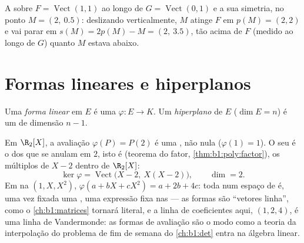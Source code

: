 \begin{omfigure}

{\small A  sobre $F = \operatorname{Vect}(1,1)$ ao longo de $G = \operatorname{Vect}(0,1)$ e a sua simetria,
no ponto $M
= (2,\ 0.5)$: deslizando verticalmente, $M$ atinge $F$ em $p(M) = (2,2)$
e vai parar em $s(M) = 2p(M) - M = (2,\ 3.5)$, tão acima de $F$ (medido ao longo de $G$)
quanto $M$ estava abaixo.}
\end{omfigure}

\section{Formas lineares e hiperplanos}

\begin{definition}\label{def:b1:linmaps:forms}
Uma \emph{forma linear} em $E$ é uma  $\varphi \colon E \to K$. Um \emph{hiperplano} de $E$ ($\dim E = n$)
é um  de dimensão $n - 1$.
\end{definition}

\begin{example}
\label{ex:b1:linmaps:evaluationform}
Em $\R_2[X]$, a avaliação $\varphi(P) = P(2)$ é uma , não nula
($\varphi(1) = 1$). O seu  é o  dos  que se anulam
em $2$, isto é (teorema do fator, \cref{thm:b1:poly:factor}), os múltiplos de $X - 2$
dentro de $\R_2[X]$:
\[
\ker\varphi = \operatorname{Vect}\bigl(X - 2,\ X(X - 2)\bigr),
\qquad \dim = 2 .
\]
Em  na  $(1, X, X^2)$, $\varphi(a + bX + cX^2) = a +
2b + 4c$: toda  num espaço
de  é, uma vez fixada uma , uma expressão 
fixa nas  --- as formas são ``vetores linha'', como o
\cref{ch:b1:matrices} tornará literal, e a linha de coeficientes aqui, $(1, 2, 4)$, é uma
linha de Vandermonde: as formas de avaliação são o modo como a
teoria da interpolação do problema de fim de semana do \cref{ch:b1:det} entra
na álgebra linear.
\end{example}

